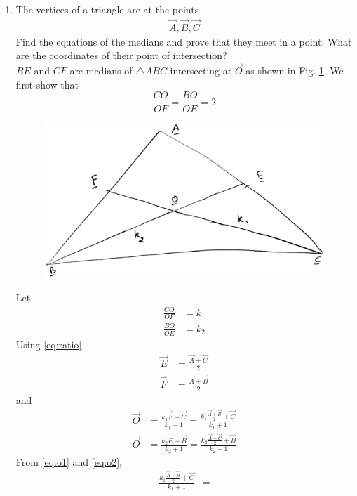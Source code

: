 \begin{enumerate}[label=\arabic*.,ref=\thesubsection.\theenumi]
%
\item The vertices of a triangle are at the points
\begin{align}
\vec{A},
\vec{B},
\vec{C}
\end{align}
Find the equations of the medians and prove that they meet in a point.  What are the coordinates of their point of intersection?
\\
 $BE$ and $CF$ are medians of $\triangle ABC$ intersecting at $\vec{O}$ as shown in Fig. \ref{fig:median}. 
We first  show that
\begin{equation}
\frac{CO}{OF} = \frac{BO}{OE} = 2
\end{equation}
%
\begin{figure}[!hb]
\centering
\includegraphics[width=\columnwidth]{./figs/median.eps}
\caption{}
\label{fig:median}
\end{figure}
 Let
\begin{align}
\frac{CO}{OF} &= k_1
\\
\frac{BO}{OE} &= k_2
\end{align}
%
Using  \eqref{eq:ratio},
\begin{align}
\vec{E}&= \frac{\vec{A} + \vec{C}}{2}
\\
\vec{F}&= \frac{\vec{A} + \vec{B}}{2}
\end{align}
%
and
\begin{align}
\label{eq:o1}
\vec{O}&= \frac{k_1\vec{F} + \vec{C}}{k_1+1} = \frac{k_1\frac{\vec{A} + \vec{B}}{2} + \vec{C}}{k_1+1}
\\
\vec{O}&= \frac{k_2\vec{E} + \vec{B}}{k_2+1} = \frac{k_2\frac{\vec{A} + \vec{C}}{2} + \vec{B}}{k_2+1}
\label{eq:o2}
\end{align}
%
From \eqref{eq:o1} and \eqref{eq:o2},
\begin{align}
 \frac{k_1\frac{\vec{A} + \vec{B}}{2} + \vec{C}}{k_1+1} &= 

\end{align}
\end{enumerate}
